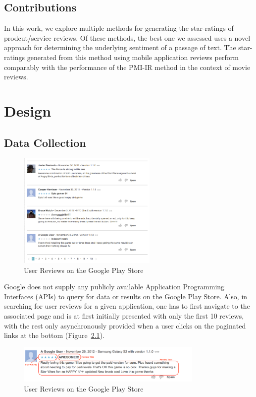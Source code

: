 \documentclass[11pt]{report} %
\begin{document}
\section{Contributions}

In this work, we explore multiple methods for generating the star-ratings of prodcut/service reviews. Of these methods, the best one we assessed uses a novel approach for determining the underlying sentiment of a passage of text. The star-ratings generated from this method using mobile application reviews perform comparably with the performance of the PMI-IR method in the context of movie reviews.

\chapter{Design}
\section{Data Collection}

\begin{figure}[h!]
  \centering
    \includegraphics[width=0.6\textwidth]{figures/playstore.png}
 \caption{User Reviews on the Google Play Store}
\label{fig:playstore}
\end{figure}

Google does not supply any publicly available Application Programming Interfaces (APIs) to query for data or results on the Google Play Store. Also, in searching for user reviews for a given application, one has to first navigate to the associated page and is at first initially presented with only the first 10 reviews, with the rest only asynchronously provided when a user clicks on the paginated links at the bottom (Figure~\ref{fig:playstore}). 

\begin{figure}[h!]
  \centering
    \includegraphics[width=0.8\textwidth]{figures/user_review.png}
 \caption{User Reviews on the Google Play Store}
\label{fig:user_review}
\end{figure}
\end{document}
